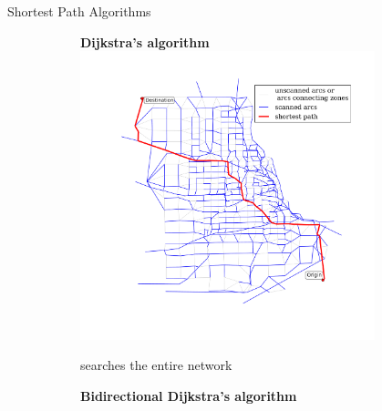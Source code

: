 \documentclass[final]{beamer}
\begin{document}
\begin{frame}{ }
\begin{columns}[t]
\begin{column}{.28\linewidth}
        \end{column}
        \begin{column}{.4\linewidth}

            \begin{block}{Shortest Path Algorithms}
                    \vspace{2em}
                \begin{figure}
                    \centering
                    \begin{subfigure}{.5\linewidth}
                        \centering
                        {\bf Dijkstra's algorithm }
                        \includegraphics[width=\linewidth,trim=120px 120px 48px 60px,clip]{img/dijkstra}
                        \caption{searches the entire network}
                    \vspace{2em}
                    \end{subfigure}%
                    \begin{subfigure}{.5\linewidth}
                        \centering
                        {\bf Bidirectional Dijkstra's algorithm}

\end{subfigure}
\end{figure}
\end{block}
\end{column}
\end{columns}
\end{frame}
\end{document}
